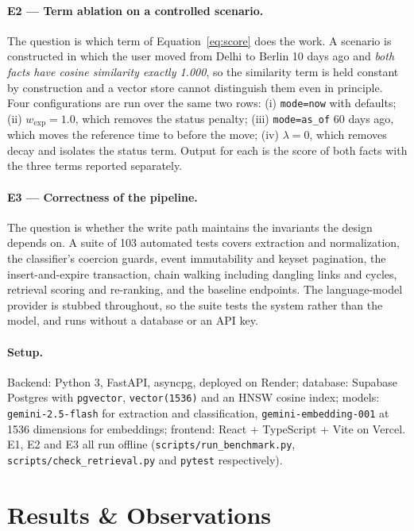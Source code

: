 \documentclass[11pt,a4paper]{article}
\begin{document}
\paragraph{E2 --- Term ablation on a controlled scenario.} The question is which
term of Equation~\eqref{eq:score} does the work. A scenario is constructed in
which the user moved from Delhi to Berlin 10 days ago and \emph{both facts have
cosine similarity exactly 1.000}, so the similarity term is held constant by
construction and a vector store cannot distinguish them even in principle. Four
configurations are run over the same two rows:
(i) \texttt{mode=now} with defaults;
(ii) $w_{\text{exp}} = 1.0$, which removes the status penalty;
(iii) \texttt{mode=as\_of} 60 days ago, which moves the reference time to before
the move;
(iv) $\lambda = 0$, which removes decay and isolates the status term.
Output for each is the score of both facts with the three terms reported
separately.

\paragraph{E3 --- Correctness of the pipeline.} The question is whether the
write path maintains the invariants the design depends on. A suite of 103
automated tests covers extraction and normalization, the classifier's coercion
guards, event immutability and keyset pagination, the insert-and-expire
transaction, chain walking including dangling links and cycles, retrieval
scoring and re-ranking, and the baseline endpoints. The language-model provider
is stubbed throughout, so the suite tests the system rather than the model, and
runs without a database or an API key.

\paragraph{Setup.} Backend: Python 3, FastAPI, asyncpg, deployed on Render;
database: Supabase Postgres with \texttt{pgvector}, \texttt{vector(1536)} and an
HNSW cosine index; models: \texttt{gemini-2.5-flash} for extraction and
classification, \texttt{gemini-embedding-001} at 1536 dimensions for embeddings;
frontend: React + TypeScript + Vite on Vercel. E1, E2 and E3 all run offline
(\texttt{scripts/run\_benchmark.py}, \texttt{scripts/check\_retrieval.py} and
\texttt{pytest} respectively).

\section{Results \& Observations}
\label{sec:results}
\end{document}
